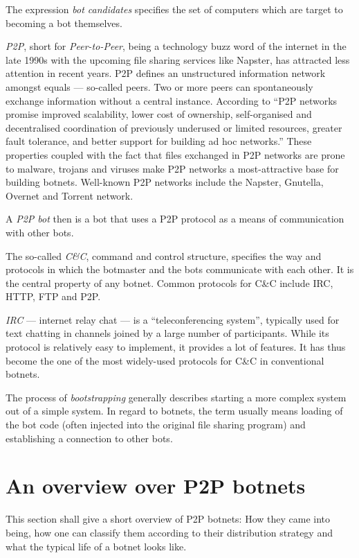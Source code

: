 \documentclass{llncs}
\begin{document}
The expression {\it bot candidates} specifies the set of computers
which are target to becoming a bot themselves.

{\it P2P}, short for {\it Peer-to-Peer}, being a technology buzz word
of the internet in the late 1990s with the upcoming file sharing
services like Napster\cite{napster}, has attracted less attention in
recent years. P2P defines an unstructured information network amongst
equals --- so-called peers. Two or more peers can spontaneously
exchange information without a central instance. According to
\cite{schoder2005core} ``P2P networks promise improved scalability,
lower cost of ownership, self-organised and decentralised coordination
of previously underused or limited resources, greater fault tolerance,
and better support for building ad hoc networks.''  These properties
coupled with the fact that files exchanged in P2P networks are prone
to malware, trojans and viruses make P2P networks a most-attractive
base for building botnets.  Well-known P2P networks include the
Napster, Gnutella, Overnet and Torrent network.  

A {\it P2P bot} then is a bot that uses a P2P protocol as a means of
communication with other bots.

The so-called {\it C\&C}, command and control structure, specifies
the way and protocols in which the botmaster and the bots communicate
with each other. It is the central property of any botnet. Common
protocols for C\&C include IRC, HTTP, FTP and
P2P.\cite{borgaonkar2010analysis}

{\it IRC} --- internet relay chat --- is a ``teleconferencing
system''\cite{irc}, typically used for text chatting in channels
joined by a large number of participants. While its protocol is
relatively easy to implement, it provides a lot of features. It has
thus become the one of the most widely-used protocols for C\&C in
conventional botnets.

The process of {\it bootstrapping} generally describes starting a more
complex system out of a simple system. In regard to botnets, the
term usually means loading of the bot code (often injected into the
original file sharing program) and establishing a connection to other
bots.\cite{wang2009systematic}


\section{An overview over P2P botnets}
This section shall give a short overview of P2P botnets: How they came
into being, how one can classify them according to their distribution
strategy and what the typical life of a botnet looks like.
\end{document}
